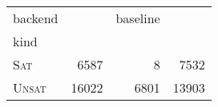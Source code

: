 \begin{tabular}{lrrr}
\toprule
backend & \Calculus{} & baseline & \Nuxmv{} \\
kind &  &  &  \\
\midrule
\textsc{Sat} & 6587 & 8 & 7532 \\
\textsc{Unsat} & 16022 & 6801 & 13903 \\
\bottomrule
\end{tabular}
